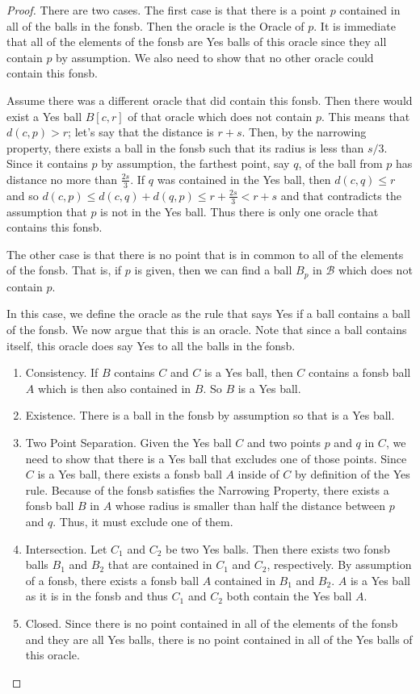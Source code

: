 \documentclass[12pt]{article}
\begin{document}
\begin{proof}
    There are two cases. The first case is that there is a point $p$ contained in all of the balls in the fonsb. Then the oracle is the Oracle of $p$. It is immediate that all of the elements of the fonsb are Yes balls of this oracle since they all contain $p$ by assumption. We 
    also need to show that no other oracle could contain this fonsb.

    Assume there was a different oracle that did contain this fonsb. Then there would exist a Yes ball $B[c,r]$ of that oracle which does not contain $p$. This means that $d(c,p) > r$; let's say that the distance is $r +s$. Then, by the narrowing property, there exists a ball in the fonsb such that its radius is less than $s/3$. Since it contains $p$ by assumption, the farthest point, say $q$, of the ball from $p$ has distance no more than $\frac{2s}{3}$. If $q$ was contained in the Yes ball, then $d(c,q)  \leq r$ and so $d(c, p) \leq d(c, q) + d(q,p) \leq r + \frac{2s}{3} < r + s$ and that contradicts the assumption that $p$ is not in the Yes ball. Thus there is only one oracle that contains this fonsb. 

    The other case is that there is no point that is in common to all of the elements of the fonsb. That is, if $p$ is given, then we can find a ball $B_p$ in $\mathcal{B}$ which does not contain $p$. 

    In this case, we define the oracle as the rule that says Yes if a ball contains a ball of the fonsb. We now argue that this is an oracle. Note that since a ball contains itself, this oracle does say Yes to all the balls in the fonsb.

    \begin{enumerate}
        \item Consistency. If $B$ contains $C$ and $C$ is a Yes ball, then $C$ contains a fonsb ball $A$ which is then also contained in $B$. So $B$ is a Yes ball.
        \item Existence. There is a ball in the fonsb by assumption so that is a Yes ball. 
        \item Two Point Separation. Given the Yes ball $C$ and two points $p$ and $q$ in $C$, we need to show that there is a Yes ball that excludes one of those points. Since $C$ is a Yes ball, there exists a fonsb ball $A$ inside of $C$ by definition of the Yes rule. Because of the fonsb satisfies the Narrowing Property, there exists a fonsb ball $B$ in $A$ whose radius is smaller than half the distance between $p$ and $q$. Thus, it must exclude one of them. 
        \item Intersection. Let $C_1$ and $C_2$ be two Yes balls. Then there exists two fonsb balls $B_1$ and $B_2$ that are contained in $C_1$ and $C_2$, respectively. By assumption of a fonsb, there exists a fonsb ball $A$ contained in $B_1$ and $B_2$. $A$ is a Yes ball as it is in the fonsb and thus $C_1$ and $C_2$ both contain the Yes ball $A$.
        \item Closed. Since there is no point contained in all of the elements of the fonsb and they are all Yes balls, there is no point contained in all of the Yes balls of this oracle. 
    \end{enumerate}


\end{proof}
\end{document}
